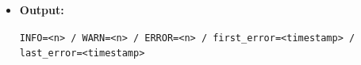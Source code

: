 \begin{itemize}
\begin{itemize}
        \item \textbf{Module 3 (Thống kê):}
        \begin{itemize}
            \item Đếm số dòng theo từng LEVEL:
            \[
            \texttt{INFO}, \texttt{WARN}, \texttt{ERROR}
            \]
            \item Nếu gặp ERROR:
            \begin{itemize}
                \item Nếu là ERROR đầu tiên $\rightarrow$ lưu \texttt{first\_error}
                \item Luôn cập nhật \texttt{last\_error}
            \end{itemize}
        \end{itemize}

        \item \textbf{Module 4 (Ghi file):}
        \begin{itemize}
            \item Hàm \texttt{writeSummary(path, info, warn, error, first, last)}
        \end{itemize}
    \end{itemize}

    \item \textbf{Output:}
    \begin{center}
    \texttt{INFO=<n> / WARN=<n> / ERROR=<n> / first\_error=<timestamp> / last\_error=<timestamp>}
    \end{center}
\end{itemize}

